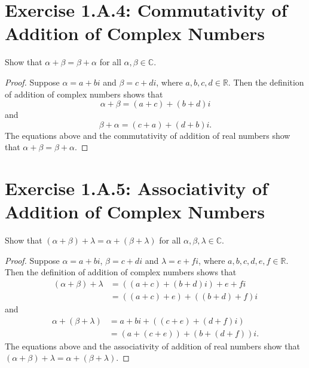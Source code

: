 \section{Exercise 1.A.4: Commutativity of Addition of Complex Numbers}
Show that $\alpha+\beta=\beta+\alpha$ for all $\alpha, \beta\in\mathbb{C}$.
\begin{proof}
Suppose $\alpha=a+bi$ and $\beta=c+di$, where $a,b,c,d\in\mathbb{R}$. Then the definition of addition of complex numbers shows that
\[
\alpha+\beta=(a+c)+(b+d)i
\]
and
\[
\beta+\alpha=(c+a)+(d+b)i.
\]
The equations above and the commutativity of addition of real numbers show that $\alpha+\beta=\beta+\alpha$.
\end{proof}

\section{Exercise 1.A.5: Associativity of Addition of Complex Numbers}
Show that $(\alpha+\beta)+\lambda=\alpha+(\beta+\lambda)$ for all $\alpha,\beta,\lambda\in\mathbb{C}$.
\begin{proof}
Suppose $\alpha=a+bi$, $\beta=c+di$ and $\lambda=e+fi$, where $a,b,c,d,e,f\in\mathbb{R}$. Then the definition of addition of complex numbers shows that
\begin{equation*}
\begin{split}
(\alpha+\beta)+\lambda&=((a+c)+(b+d)i)+e+fi\\
&=((a+c)+e)+((b+d)+f)i
\end{split}
\end{equation*}
and
\begin{equation*}
\begin{split}
\alpha+(\beta+\lambda)&=a+bi+((c+e)+(d+f)i)\\
&=(a+(c+e))+(b+(d+f))i.
\end{split}
\end{equation*}
The equations above and the associativity of addition of real numbers show that $(\alpha+\beta)+\lambda=\alpha+(\beta+\lambda)$.
\end{proof}

